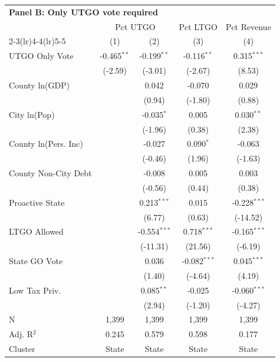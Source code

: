 \begingroup
\centering
\begin{tabular*}{\textwidth}{@{\extracolsep{\fill}}lcccc}
\multicolumn{5}{l}{\textbf{Panel B: Only UTGO vote required}}\\

\addlinespace
   \toprule
    & \multicolumn{2}{c}{Pct UTGO} & Pct LTGO & Pct Revenue\\
   \cmidrule(lr){2-3}\cmidrule(lr){4-4}\cmidrule(lr){5-5}
                        & (1)           & (2)            & (3)            & (4)\\  
   \midrule 
   UTGO Only Vote       & -0.465$^{**}$ & -0.199$^{**}$  & -0.116$^{**}$  & 0.315$^{***}$\\   
                        & (-2.59)      & (-3.01)       & (-2.67)       & (8.53)\\   
   County ln(GDP)       &               & 0.042          & -0.070         & 0.029\\   
                        &               & (0.94)        & (-1.80)       & (0.88)\\   
   City ln(Pop)         &               & -0.035$^{*}$   & 0.005          & 0.030$^{**}$\\   
                        &               & (-1.96)       & (0.38)        & (2.38)\\   
   County ln(Pers. Inc) &               & -0.027         & 0.090$^{*}$    & -0.063\\   
                        &               & (-0.46)       & (1.96)        & (-1.63)\\   
   County Non-City Debt &               & -0.008         & 0.005          & 0.003\\   
                        &               & (-0.56)       & (0.44)        & (0.38)\\   
   Proactive State      &               & 0.213$^{***}$  & 0.015          & -0.228$^{***}$\\   
                        &               & (6.77)        & (0.63)        & (-14.52)\\   
   LTGO Allowed         &               & -0.554$^{***}$ & 0.718$^{***}$  & -0.165$^{***}$\\   
                        &               & (-11.31)      & (21.56)       & (-6.19)\\   
   State GO Vote        &               & 0.036          & -0.082$^{***}$ & 0.045$^{***}$\\   
                        &               & (1.40)        & (-4.64)       & (4.19)\\   
   Low Tax Priv.        &               & 0.085$^{**}$   & -0.025         & -0.060$^{***}$\\   
                        &               & (2.94)        & (-1.20)       & (-4.27)\\   
   \hline
   N         & 1,399         & 1,399          & 1,399          & 1,399\\  
   Adj. R$^2$       & 0.245         & 0.579          & 0.598          & 0.177\\  
   Cluster              & State & State & State & State\\  
   \bottomrule
\end{tabular*}
\par\endgroup

